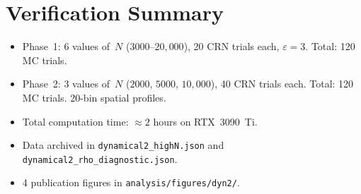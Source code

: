 \documentclass[11pt,a4paper]{article}
\begin{document}
\section{Verification Summary}

\begin{itemize}
\item Phase~1: 6 values of~$N$ ($3000$--$20{,}000$), 20 CRN trials each, $\varepsilon = 3$. Total: 120 MC trials.
\item Phase~2: 3 values of~$N$ ($2000$, $5000$, $10{,}000$), 40 CRN trials each. Total: 120 MC trials. 20-bin spatial profiles.
\item Total computation time: $\approx 2$ hours on RTX~3090~Ti.
\item Data archived in \texttt{dynamical2\_highN.json} and \texttt{dynamical2\_rho\_diagnostic.json}.
\item 4 publication figures in \texttt{analysis/figures/dyn2/}.
\end{itemize}
\end{document}
